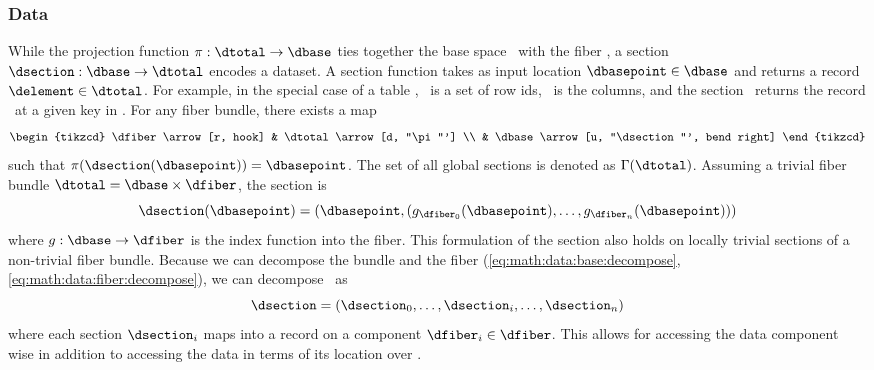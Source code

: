 \documentclass[../main.tex]{subfiles}
\begin{document}
\subsubsection{Data \dsection}
\label{sec:math:data:section}
While the projection function $\pi:\dtotal \rightarrow\dbase$ ties together the base space \dbase\ with the fiber \dfiber, a section $\dsection: \dbase\rightarrow \dtotal$ encodes a dataset. A section function takes as input location $\dbasepoint \in \dbase$ and returns a record $\delement \in \dtotal$. For example, in the special case of a table \cite{spivakSIMPLICIALDATABASES}, \dbase\ is a set of row ids, \dfiber\ is the columns, and the section \dsection\ returns the record \delement\ at a given key in \dbase. For any fiber bundle, there exists a map
\begin{equation}
    \begin{tikzcd}
        \dfiber \arrow[r, hook] & \dtotal \arrow[d, "\pi"'] \\
                          & \dbase \arrow[u, "\dsection"', bend right]
    \end{tikzcd}
\end{equation}
 such that $\pi(\dsection(\dbasepoint)) = \dbasepoint$. The set of all global sections is denoted as $\Gamma(\dtotal)$. Assuming a trivial fiber bundle $\dtotal = \dbase \times \dfiber$, the section is 
\begin{equation}
    \label{eq:section_return}
    \dsection(\dbasepoint) = (\dbasepoint, (g_{\dfiber_{0}}(\dbasepoint), \ldots, g_{\dfiber_{n}}(\dbasepoint)))
\end{equation}
where $g: \dbase \rightarrow \dfiber$ is the index function into the fiber. This formulation of the section also holds on locally trivial sections of a non-trivial fiber bundle. Because we can decompose the bundle and the fiber (\autoref{eq:math:data:base:decompose}, \autoref{eq:math:data:fiber:decompose}), we can decompose \dsection\ as 
\begin{equation}
\label{eq:math:data:section:decompose}
\dsection= (\dsection_0,\ldots, \dsection_i, \dots, \dsection_n) 
\end{equation}
where each section $\dsection_i$ maps into a record on a component $\dfiber_i \in \dfiber$. This allows for accessing the data component wise in addition to accessing the data in terms of its location over \dbase.
\end{document}
